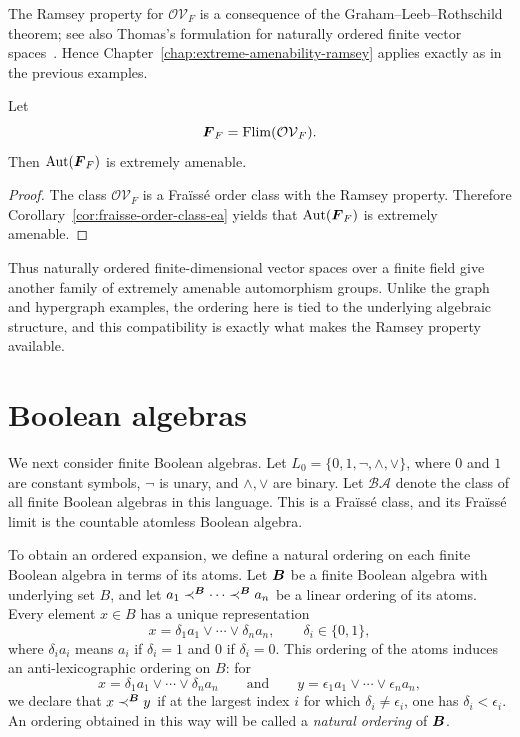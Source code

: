 The Ramsey property for \(\mathcal{OV}_F\) is a consequence of the Graham--Leeb--Rothschild theorem; see also Thomas's formulation for naturally ordered finite vector spaces~\cite{GLR,Th}. Hence Chapter~\ref{chap:extreme-amenability-ramsey} applies exactly as in the previous examples.

\begin{theorem}
    \label{thm:finite-field-vector-spaces-ea}
    Let
    \[
        \boldsymbol{F}_F=\operatorname{Flim}(\mathcal{OV}_F).
    \]
    Then \(\operatorname{Aut}(\boldsymbol{F}_F)\) is extremely amenable.
\end{theorem}

\begin{proof}
    The class \(\mathcal{OV}_F\) is a Fraïssé order class with the Ramsey property. Therefore Corollary~\ref{cor:fraisse-order-class-ea} yields that \(\operatorname{Aut}(\boldsymbol{F}_F)\) is extremely amenable.
\end{proof}

Thus naturally ordered finite-dimensional vector spaces over a finite field give another family of extremely amenable automorphism groups. Unlike the graph and hypergraph examples, the ordering here is tied to the underlying algebraic structure, and this compatibility is exactly what makes the Ramsey property available.

\section{Boolean algebras}

We next consider finite Boolean algebras. Let \(L_0=\{0,1,\neg,\wedge,\vee\}\), where \(0\) and \(1\) are constant symbols, \(\neg\) is unary, and \(\wedge,\vee\) are binary. Let \(\mathcal{BA}\) denote the class of all finite Boolean algebras in this language. This is a Fraïssé class, and its Fraïssé limit is the countable atomless Boolean algebra.

To obtain an ordered expansion, we define a natural ordering on each finite Boolean algebra in terms of its atoms. Let \(\boldsymbol{B}\) be a finite Boolean algebra with underlying set \(B\), and let \(a_1\prec^{\boldsymbol{B}}\cdots\prec^{\boldsymbol{B}}a_n\) be a linear ordering of its atoms. Every element \(x\in B\) has a unique representation
\[
    x=\delta_1 a_1\vee\cdots\vee \delta_n a_n,
    \qquad
    \delta_i\in\{0,1\},
\]
where \(\delta_i a_i\) means \(a_i\) if \(\delta_i=1\) and \(0\) if \(\delta_i=0\). This ordering of the atoms induces an anti-lexicographic ordering on \(B\): for
\[
    x=\delta_1 a_1\vee\cdots\vee \delta_n a_n
    \qquad\text{and}\qquad
    y=\epsilon_1 a_1\vee\cdots\vee \epsilon_n a_n,
\]
we declare that \(x\prec^{\boldsymbol{B}}y\) if at the largest index \(i\) for which \(\delta_i\neq \epsilon_i\), one has \(\delta_i<\epsilon_i\).
An ordering obtained in this way will be called a \emph{natural ordering} of \(\boldsymbol{B}\).

